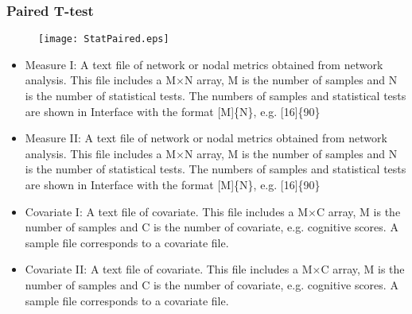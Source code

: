 \documentclass[11pt]{article}
\begin{document}
            \subsubsection{Paired T-test}
				\begin{figure}
					\begin{center}
						\texttt{[image: StatPaired.eps]}
					\end{center}
				\end{figure}
                \begin{itemize}
                    \item Measure I: A text file of network or nodal
                        metrics obtained from network analysis. This file
                        includes a M$\times$N array, M is the number of
                        samples and N is the number of statistical tests.
                        The numbers of samples and statistical tests are
                        shown in Interface with the format [M]\{N\}, 
                        e.g. [16]\{90\}
                    \item Measure II: A text file of network or nodal
                        metrics obtained from network analysis. This file
                        includes a M$\times$N array, M is the number of
                        samples and N is the number of statistical tests.
                        The numbers of samples and statistical tests are
                        shown in Interface with the format [M]\{N\}, 
                        e.g. [16]\{90\}
                    \item Covariate I: A text file of covariate. This file
                        includes a M$\times$C array, M is the number of 
                        samples and C is the number of covariate, e.g. 
                        cognitive scores. A sample file 
                        corresponds to a covariate file.
                    \item Covariate II: A text file of covariate. This file
                        includes a M$\times$C array, M is the number of 
                        samples and C is the number of covariate, e.g. 
                        cognitive scores. A sample file corresponds to a 
                        covariate file.
                \end{itemize}
\end{document}
